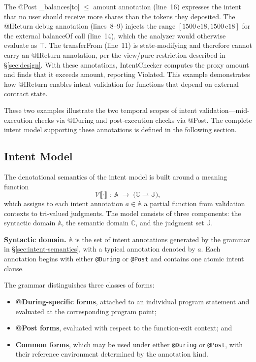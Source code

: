\documentclass[pdflatex,sn-basic]{sn-jnl}%
\theoremstyle{thmstyleone}%
\theoremstyle{thmstyletwo}%
\theoremstyle{thmstylethree}%
\begin{document}
The @Post \_balances[to] $\leq$ amount annotation (line~16) expresses the intent that no user should receive more shares than the tokens they deposited.
The @IReturn debug annotation (lines~8--9) injects the range $[1500\,\text{e}18, 1500\,\text{e}18]$ for the external balanceOf call (line~14), which the analyzer would otherwise evaluate as $\top$.
The transferFrom (line~11) is state-modifying and therefore cannot carry an @IReturn annotation, per the view/pure restriction described in \S\ref{sec:design}.
With these annotations, IntentChecker computes the proxy amount and finds that it exceeds amount, reporting Violated.
This example demonstrates how @IReturn enables intent validation for functions that depend on external contract state.

\smallskip
These two examples illustrate the two temporal scopes of intent validation---mid-execution checks via @During and post-execution checks via @Post.
The complete intent model supporting these annotations is defined in the following section.

\subsection{Intent Model}\label{sec:intent-model}

The denotational semantics of the intent model is built around a meaning function
\[
\mathcal{V}\llbracket \cdot \rrbracket
\;\colon\;
\mathbb{A}
\;\to\;
\bigl(\mathbb{C} \rightharpoonup \mathbb{J}\bigr),
\]
which assigns to each intent annotation $a \in \mathbb{A}$ a partial function
from validation contexts to tri-valued judgments.
The model consists of three components: the syntactic domain $\mathbb{A}$,
the semantic domain $\mathbb{C}$, and the judgment set $\mathbb{J}$.

\smallskip
\noindent\textbf{Syntactic domain.}
$\mathbb{A}$ is the set of intent annotations generated by the grammar in
\S\ref{sec:intent-semantics}, with a typical annotation denoted by $a$.
Each annotation begins with either \texttt{@During} or \texttt{@Post} and
contains one atomic intent clause.

The grammar distinguishes three classes of forms:
\begin{itemize}
    \item \textbf{@During-specific forms}, attached to an individual program
    statement and evaluated at the corresponding program point;
    \item \textbf{@Post forms}, evaluated with respect to the function-exit
    context; and
    \item \textbf{Common forms}, which may be used under either
    \texttt{@During} or \texttt{@Post}, with their reference environment
    determined by the annotation kind.
\end{itemize}
\end{document}
